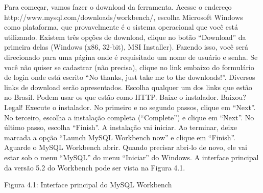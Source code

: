 Para começar, vamos fazer o download da ferramenta. Acesse o endereço http://www.mysql.com/downloads/workbench/, escolha Microsoft Windows como plataforma, que provavelmente é o sistema operacional que você está utilizando. Existem três opções de download, clique no botão “Download” da primeira delas (Windows (x86, 32-bit), MSI Installer). Fazendo isso, você será direcionado para uma página onde é requisitado um nome de usuário e senha. Se você não quiser se cadastrar (não precisa), clique no link embaixo do formulário de login onde está escrito “No thanks, just take me to the downloads!”. Diversos links de download serão apresentados. Escolha qualquer um dos links que estão no Brasil. Podem usar os que estão como HTTP. Baixe o instalador.
Baixou? Legal! Execute o instalador. No primeiro e no segundo passos, clique em “Next”. No terceiro, escolha a instalação completa (“Complete”) e clique em “Next”. No último passo, escolha “Finish”. A instalação vai iniciar. Ao terminar, deixe marcada a opção “Launch MySQL Workbench now” e clique em “Finish”. Aguarde o MySQL Workbench abrir. Quando precisar abri-lo de novo, ele vai estar sob o menu “MySQL” do menu “Iniciar” do Windows.
A interface principal da versão 5.2 do Workbench pode ser vista na Figura 4.1.

Figura 4.1: Interface principal do MySQL Workbench
 
